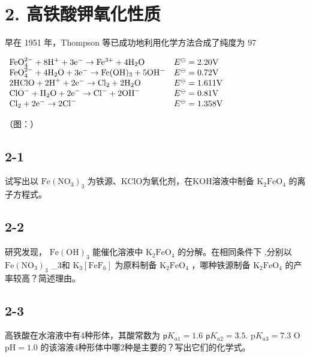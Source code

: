 \section*{2. 高铁酸钾氧化性质}
早在 1951 年，Thompson 等已成功地利⽤化学⽅法合成了纯度为 97%

$
\begin{array}{l l}\mathrm {FeO_ {4} ^ {2 - } + 8 H^ {+} + 3 e^ {-} \rightarrow Fe^ {3 + } + 4 H_ {2} O}&E ^ {\ominus} = 2. 2 0 \mathrm{V}\\\mathrm {FeO_ {4} ^ {2 - } + 4 H_ {2} O + 3 e^ {-} \rightarrow Fe(OH) _ {3} + 5 OH^ {-}}&E ^ {\ominus} = 0. 7 2 \mathrm{V}\\2 \mathrm{HClO+2H} ^ {+} + 2 \mathrm{e} ^ {-} \rightarrow \mathrm{Cl} _ {2} + 2 \mathrm{H} _ {2} \mathrm{O}&E ^ {\ominus} = 1. 6 1 1 \mathrm{V}\\\mathrm{ClO} ^ {-} + \mathrm{H} _ {2} \mathrm{O+2e} ^ {-} \rightarrow \mathrm{Cl} ^ {-} + 2 \mathrm{OH} ^ {-}&E ^ {\ominus} = 0. 8 1 \mathrm{V}\\\mathrm{Cl} _ {2} + 2 \mathrm{e} ^ {-} \rightarrow 2 \mathrm{Cl} ^ {-}&E ^ {\ominus} = 1. 3 5 8 \mathrm{V}\end{array}
$

（图：）

\subsection*{2-1}
试写出以 $\mathrm { F e ( N O _ { 3 } ) _ { 3 } }$ 为铁源、KClO为氧化剂，在KOH溶液中制备 $\mathrm { K _ { 2 } F e O _ { 4 } }$ 的离⼦⽅程式。

\subsection*{2-2}
研究发现， $\mathrm { F e ( O H ) _ { 3 } }$ 能催化溶液中 $\mathrm { K _ { 2 } F e O _ { 4 } }$ 的分解。在相同条件下 ,分别以 $\mathrm { F e ( N O _ { 3 } ) _ { 3 } }$ _{3}和 $\mathrm { K _ { 3 } [ F e F _ { 6 } ] }$ 为原料制备 $\mathrm { K _ { 2 } F e O _ { 4 } }$ ，哪种铁源制备 $\mathrm { K _ { 2 } F e O _ { 4 } }$ 的产率较⾼？简述理由。

\subsection*{2-3}
⾼铁酸在⽔溶液中有4种形体，其酸常数为 $\mathsf { p } K _ { a 1 } = 1 . 6$ $\mathsf { p } K _ { a 2 } = 3 . 5 .$ $\mathrm { p } K _ { a 3 } = 7 . 3$ O $\mathrm { p H } = 1 . 0$ 的该溶液4种形体中哪2种是主要的？写出它们的化学式。

